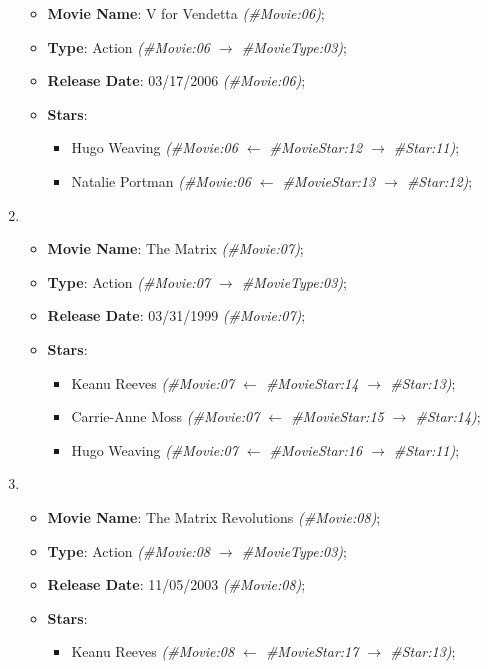 \begin{enumerate}
{				\begin{itemize}
					\item{\textbf{Movie Name}: V for Vendetta \textit{(\#Movie:06)};}
					\item{\textbf{Type}: Action \textit{(\#Movie:06 $\to$ \#MovieType:03)};}
					\item{\textbf{Release Date}: 03/17/2006 \textit{(\#Movie:06)};}
					\item{\textbf{Stars}:
						\begin{itemize}
							\item{Hugo Weaving \textit{(\#Movie:06 $\gets$ \#MovieStar:12 $\to$ \#Star:11)};}
							\item{Natalie Portman \textit{(\#Movie:06 $\gets$ \#MovieStar:13 $\to$ \#Star:12)};}
						\end{itemize}}
				\end{itemize}}
			\item{%
				\begin{itemize}
					\item{\textbf{Movie Name}: The Matrix \textit{(\#Movie:07)};}
					\item{\textbf{Type}: Action \textit{(\#Movie:07 $\to$ \#MovieType:03)};}
					\item{\textbf{Release Date}: 03/31/1999 \textit{(\#Movie:07)};}
					\item{\textbf{Stars}:
						\begin{itemize}
							\item{Keanu Reeves \textit{(\#Movie:07 $\gets$ \#MovieStar:14 $\to$ \#Star:13)};}
							\item{Carrie-Anne Moss \textit{(\#Movie:07 $\gets$ \#MovieStar:15 $\to$ \#Star:14)};}
							\item{Hugo Weaving \textit{(\#Movie:07 $\gets$ \#MovieStar:16 $\to$ \#Star:11)};}
						\end{itemize}}
				\end{itemize}}
			\item{%
				\begin{itemize}
					\item{\textbf{Movie Name}: The Matrix Revolutions \textit{(\#Movie:08)};}
					\item{\textbf{Type}: Action \textit{(\#Movie:08 $\to$ \#MovieType:03)};}
					\item{\textbf{Release Date}: 11/05/2003 \textit{(\#Movie:08)};}
					\item{\textbf{Stars}:
						\begin{itemize}
							\item{Keanu Reeves \textit{(\#Movie:08 $\gets$ \#MovieStar:17 $\to$ \#Star:13)};}

\end{itemize}}
\end{itemize}}
\end{enumerate}
